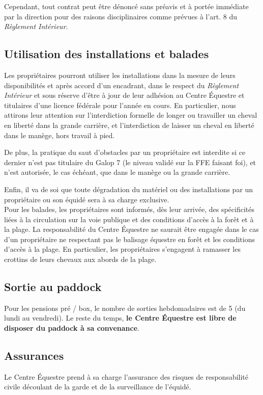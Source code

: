 \documentclass[11pt,a4paper]{article}
\begin{document}
Cependant, tout contrat peut être dénoncé sans préavis et à portée immédiate par la direction pour des raisons disciplinaires comme prévues à l'art. 8 du \textit{Règlement Intérieur}.

\subsection*{Utilisation des installations et balades}
Les propriétaires pourront utiliser les installations dans la mesure de leurs disponibilités et après accord d'un encadrant, dans le respect du \textit{Règlement Intérieur} et sous réserve d'être à jour de leur adhésion au Centre Équestre et titulaires d'une licence fédérale pour l'année en cours. En particulier, nous attirons leur attention sur l'interdiction formelle de longer ou travailler un cheval en liberté dans la grande carrière, et l'interdiction de laisser un cheval en liberté dans le manège, hors travail à pied.

De plus, la pratique du saut d'obstacles par un propriétaire est interdite si ce dernier n'est pas titulaire du Galop 7 (le niveau validé sur la FFE faisant foi), et n'est autorisée, le cas échéant, que dans le manège ou la grande carrière.

Enfin, il va de soi que toute dégradation du matériel ou des installations par un propriétaire ou son équidé sera à sa charge exclusive.
\\

Pour les balades, les propriétaires sont informés, dès leur arrivée, des spécificités liées à la circulation sur la voie publique et des conditions d'accès à la forêt et à la plage. La responsabilité du Centre Équestre ne saurait être engagée dans le cas d'un propriétaire ne respectant pas le balisage équestre en forêt et les conditions d'accès à la plage. En particulier, les propriétaires s'engagent à ramasser les crottins de leurs chevaux aux abords de la plage.

\subsection*{Sortie au paddock}
Pour les pensions pré / box, le nombre  de sorties hebdomadaires est de 5 (du lundi au vendredi). Le reste du temps, \textbf{le Centre Équestre est libre de disposer du paddock à sa convenance}.

\subsection*{Assurances}
Le Centre Équestre prend à sa charge l'assurance des risques de responsabilité civile découlant de la garde et de la surveillance de l'équidé.
\end{document}
